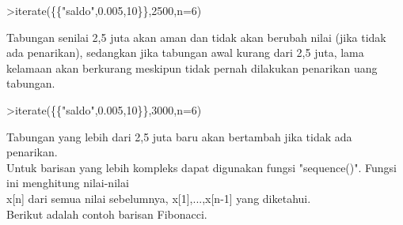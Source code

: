 \documentclass[12pt,arial,letterpaper]{book}
\begin{document}
\begin{eulernootebook}
\begin{eulercomment}
\begin{eulercomment}
\begin{eulernootebook}
\begin{eulercomment}
\begin{eulercomment}
\begin{eulercomment}
\begin{eulercomment}
\begin{eulercomment}
\begin{eulercomment}
\begin{eulernotebook}
\begin{eulercomment}
\begin{eulercomment}
\begin{eulercomment}
\begin{eulercomment}
\begin{eulercomment}
\begin{eulercomment}
\begin{eulercomment}
\begin{eulercomment}
\begin{eulercomment}
\begin{eulercomment}
\begin{eulercomment}
\begin{eulercomment}
\begin{eulercomment}
\begin{eulercomment}
\begin{eulercomment}
\begin{eulercomment}
\begin{eulercomment}
\begin{eulercomment}
\begin{eulercomment}
\begin{eulercomment}
\begin{eulercomment}
\begin{eulercomment}
\begin{eulercomment}
\begin{eulercomment}
\begin{eulercomment}
\begin{eulercomment}
\begin{eulerprompt}
>iterate(\{\{"saldo",0.005,10\}\},2500,n=6)
\end{eulerprompt}
\begin{euleroutput}
  [2500,  2500,  2500,  2500,  2500,  2500,  2500]
\end{euleroutput}
\begin{eulercomment}
Tabungan senilai 2,5 juta akan aman dan tidak akan berubah nilai (jika
tidak ada penarikan), sedangkan jika tabungan awal kurang dari 2,5
juta, lama kelamaan akan berkurang meskipun tidak pernah dilakukan
penarikan uang tabungan.
\end{eulercomment}
\begin{eulerprompt}
>iterate(\{\{"saldo",0.005,10\}\},3000,n=6)
\end{eulerprompt}
\begin{euleroutput}
  [3000,  3002,  3004.01,  3006.03,  3008.05,  3010.08,  3012.12]
\end{euleroutput}
\begin{eulercomment}
Tabungan yang lebih dari 2,5 juta baru akan bertambah jika tidak ada
penarikan.\\
Untuk barisan yang lebih kompleks dapat digunakan fungsi "sequence()".
Fungsi ini menghitung nilai-nilai\\
x[n] dari semua nilai sebelumnya, x[1],...,x[n-1] yang diketahui.\\
Berikut adalah contoh barisan Fibonacci.


\end{eulercomment}
\end{eulercomment}
\end{eulercomment}
\end{eulercomment}
\end{eulercomment}
\end{eulercomment}
\end{eulercomment}
\end{eulercomment}
\end{eulercomment}
\end{eulercomment}
\end{eulercomment}
\end{eulercomment}
\end{eulercomment}
\end{eulercomment}
\end{eulercomment}
\end{eulercomment}
\end{eulercomment}
\end{eulercomment}
\end{eulercomment}
\end{eulercomment}
\end{eulercomment}
\end{eulercomment}
\end{eulercomment}
\end{eulercomment}
\end{eulercomment}
\end{eulercomment}
\end{eulercomment}
\end{eulernotebook}
\end{eulercomment}
\end{eulercomment}
\end{eulercomment}
\end{eulercomment}
\end{eulercomment}
\end{eulercomment}
\end{eulernootebook}
\end{eulercomment}
\end{eulercomment}
\end{eulernootebook}
\end{document}
